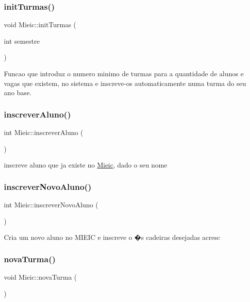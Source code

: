 \subsubsection{\texorpdfstring{init\+Turmas()}{initTurmas()}}
{\footnotesize\ttfamily void Mieic\+::init\+Turmas (\begin{DoxyParamCaption}\item[{int}]{semestre }\end{DoxyParamCaption})}

Funcao que introduz o numero minimo de turmas para a quantidade de alunos e vagas que existem, no sistema e inscreve-\/os automaticamente numa turma do seu ano base. \hypertarget{class_mieic_a00d811a1d6f6ce0fa591df08dffe535b}{}\label{class_mieic_a00d811a1d6f6ce0fa591df08dffe535b} 
\subsubsection{\texorpdfstring{inscrever\+Aluno()}{inscreverAluno()}}
{\footnotesize\ttfamily int Mieic\+::inscrever\+Aluno (\begin{DoxyParamCaption}{ }\end{DoxyParamCaption})}

inscreve aluno que ja existe no \hyperlink{class_mieic}{Mieic}, dado o seu nome \hypertarget{class_mieic_ae8cda55b53cbf1cbc9063bee1c61c01f}{}\label{class_mieic_ae8cda55b53cbf1cbc9063bee1c61c01f} 
\subsubsection{\texorpdfstring{inscrever\+Novo\+Aluno()}{inscreverNovoAluno()}}
{\footnotesize\ttfamily int Mieic\+::inscrever\+Novo\+Aluno (\begin{DoxyParamCaption}{ }\end{DoxyParamCaption})}

Cria um novo aluno no M\+I\+E\+IC e inscreve o �s cadeiras desejadas acresc \hypertarget{class_mieic_abce67fb5c236e47b7f0fb415c57c21b4}{}\label{class_mieic_abce67fb5c236e47b7f0fb415c57c21b4} 
\subsubsection{\texorpdfstring{nova\+Turma()}{novaTurma()}}
{\footnotesize\ttfamily void Mieic\+::nova\+Turma (\begin{DoxyParamCaption}{ }\end{DoxyParamCaption})}

